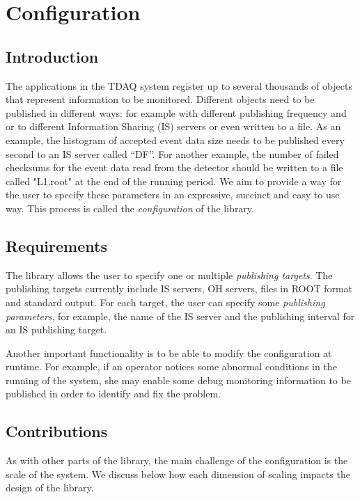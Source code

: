\chapter{Configuration} %
\label{Capitolul3}

\section{Introduction}

The applications in the TDAQ system register up to several thousands of objects that represent information to be monitored. Different objects need to be published in different ways: for example with different publishing frequency and or to different Information Sharing (IS) servers \citep{kolosinformation} or even written to a file. As an example, the histogram of accepted event data size needs to be published every second to an IS server called “DF”. For another example, the number of failed checksums for the event data read from the detector should be written to a file called "L1.root" at the end of the running period. We aim to provide a way for the user to specify these parameters in an expressive, succinct and easy to use way. This process is called the \emph{configuration} of the library.

\section{Requirements}

The library allows the user to specify one or multiple \emph{publishing targets}. The publishing targets currently include IS servers, OH servers, files in ROOT \citep{brun1997root} format and standard output. For each target, the user can specify some \emph{publishing parameters}, for example, the name of the IS server and the publishing interval for an IS publishing target.

Another important functionality is to be able to modify the configuration at runtime. For example, if an operator notices some abnormal conditions in the running of the system, she may enable some debug monitoring information to be published in order to identify and fix the problem. 

\section{Contributions}

As with other parts of the library, the main challenge of the configuration is the scale of the system. We discuss below how each dimension of scaling impacts the design of the library.

